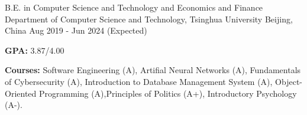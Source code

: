 

\begin{cventries}

  \cventry
    {B.E. in Computer Science and Technology and Economics and Finance} %
    {Department of Computer Science and Technology, Tsinghua University} %
    {Beijing, China} %
    {Aug 2019 - Jun 2024 (Expected)} %
    {
      \begin{cvitems} %
        \item {\textbf{GPA:}} 3.87/4.00
        \item {\textbf{Courses:} Software Engineering (A), Artifial Neural Networks (A), Fundamentals of Cybersecurity (A), Introduction to Database Management System (A), Object-Oriented Programming (A),Principles of Politics (A+), Introductory Psychology (A-).}
      \end{cvitems}
    }

\end{cventries}
